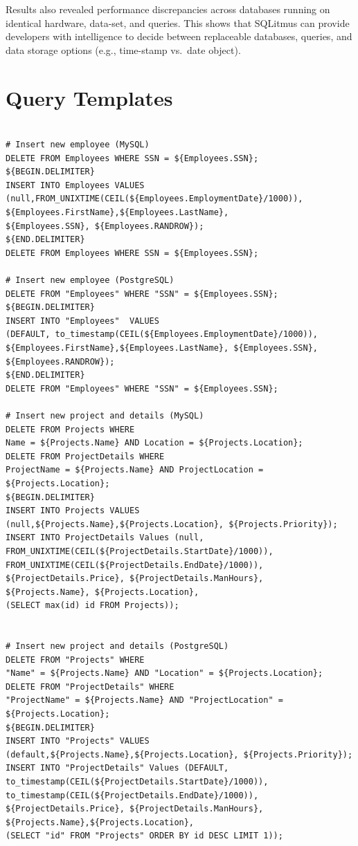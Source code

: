 \documentclass[12pt]{report}
\begin{document}
\begin{spacing}{1.9}
	Results also revealed performance discrepancies across databases running on identical hardware, data-set, and queries. This shows that SQLitmus can provide developers with intelligence to decide between replaceable databases, queries, and data storage options (e.g., time-stamp vs.\ date object).
	
	\printbibliography
	
	\appendix
	
	\chapter{Query Templates}
	
	\begin{verbatim}
	
# Insert new employee (MySQL)
DELETE FROM Employees WHERE SSN = ${Employees.SSN};
${BEGIN.DELIMITER}
INSERT INTO Employees VALUES 
(null,FROM_UNIXTIME(CEIL(${Employees.EmploymentDate}/1000)),
${Employees.FirstName},${Employees.LastName}, 
${Employees.SSN}, ${Employees.RANDROW});
${END.DELIMITER}
DELETE FROM Employees WHERE SSN = ${Employees.SSN};

# Insert new employee (PostgreSQL)
DELETE FROM "Employees" WHERE "SSN" = ${Employees.SSN};
${BEGIN.DELIMITER}
INSERT INTO "Employees"  VALUES 
(DEFAULT, to_timestamp(CEIL(${Employees.EmploymentDate}/1000)),
${Employees.FirstName},${Employees.LastName}, ${Employees.SSN}, 
${Employees.RANDROW});
${END.DELIMITER}
DELETE FROM "Employees" WHERE "SSN" = ${Employees.SSN};

# Insert new project and details (MySQL)
DELETE FROM Projects WHERE 
Name = ${Projects.Name} AND Location = ${Projects.Location};
DELETE FROM ProjectDetails WHERE 
ProjectName = ${Projects.Name} AND ProjectLocation = ${Projects.Location};
${BEGIN.DELIMITER}
INSERT INTO Projects VALUES 
(null,${Projects.Name},${Projects.Location}, ${Projects.Priority});
INSERT INTO ProjectDetails Values (null, 
FROM_UNIXTIME(CEIL(${ProjectDetails.StartDate}/1000)), 
FROM_UNIXTIME(CEIL(${ProjectDetails.EndDate}/1000)),
${ProjectDetails.Price}, ${ProjectDetails.ManHours}, 
${Projects.Name}, ${Projects.Location},
(SELECT max(id) id FROM Projects));


# Insert new project and details (PostgreSQL)
DELETE FROM "Projects" WHERE 
"Name" = ${Projects.Name} AND "Location" = ${Projects.Location};
DELETE FROM "ProjectDetails" WHERE 
"ProjectName" = ${Projects.Name} AND "ProjectLocation" = ${Projects.Location};
${BEGIN.DELIMITER}
INSERT INTO "Projects" VALUES 
(default,${Projects.Name},${Projects.Location}, ${Projects.Priority});
INSERT INTO "ProjectDetails" Values (DEFAULT, 
to_timestamp(CEIL(${ProjectDetails.StartDate}/1000)), 
to_timestamp(CEIL(${ProjectDetails.EndDate}/1000)),
${ProjectDetails.Price}, ${ProjectDetails.ManHours}, 
${Projects.Name},${Projects.Location}, 
(SELECT "id" FROM "Projects" ORDER BY id DESC LIMIT 1));


\end{verbatim}
\end{spacing}
\end{document}
